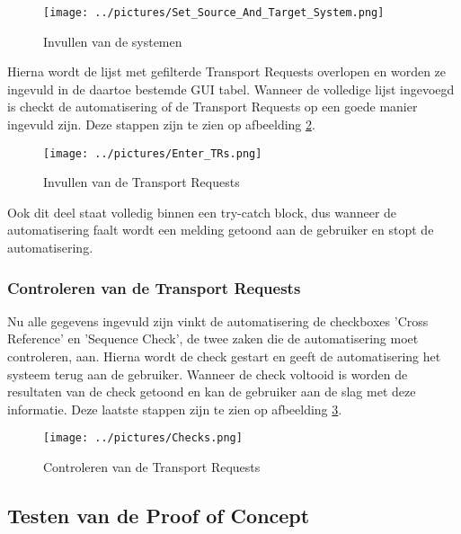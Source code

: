 \begin{figure}
    \centering
    \texttt{[image: ../pictures/Set\_Source\_And\_Target\_System.png]}
    \caption{Invullen van de systemen}
    \label{fig:invullen-systemen}
\end{figure}

Hierna wordt de lijst met gefilterde Transport Requests overlopen en worden ze ingevuld in de daartoe bestemde GUI tabel. Wanneer de volledige lijst ingevoegd is checkt de automatisering of de Transport Requests op een goede manier ingevuld zijn.
Deze stappen zijn te zien op afbeelding \ref{fig:controleren-transport-requests}.

\begin{figure}
    \centering
    \texttt{[image: ../pictures/Enter\_TRs.png]}
    \caption{Invullen van de Transport Requests}
    \label{fig:controleren-transport-requests}
\end{figure}

Ook dit deel staat volledig binnen een try-catch block, dus wanneer de automatisering faalt wordt een melding getoond aan de gebruiker en stopt de automatisering.

\subsubsection{Controleren van de Transport Requests}
\label{subsubsec:controleren-transport-requests}

Nu alle gegevens ingevuld zijn vinkt de automatisering de checkboxes 'Cross Reference' en 'Sequence Check', de twee zaken die de automatisering moet controleren, aan. Hierna wordt de check gestart en geeft de automatisering het systeem terug aan de gebruiker. Wanneer de check voltooid is worden de resultaten van de check getoond en kan de gebruiker aan de slag met deze informatie.
Deze laatste stappen zijn te zien op afbeelding \ref{fig:controleren-trs}.

\begin{figure}
    \centering
    \texttt{[image: ../pictures/Checks.png]}
    \caption{Controleren van de Transport Requests}
    \label{fig:controleren-trs}
\end{figure}

\subsection{Testen van de Proof of Concept}
\label{subsec:testen-proof-of-concept}

